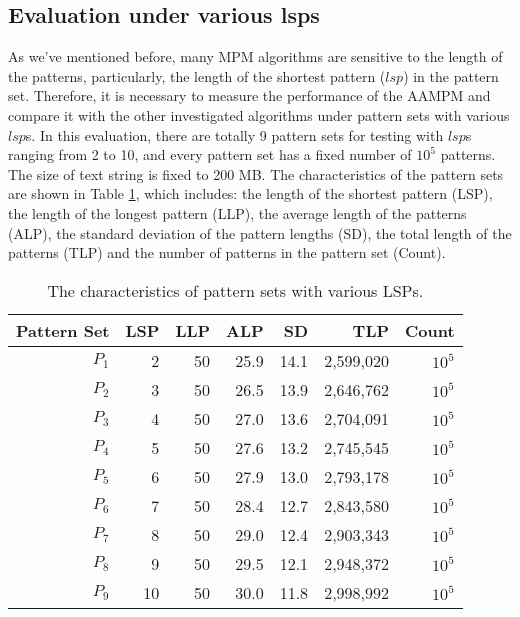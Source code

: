 \documentclass{article}
\begin{document}



\subsection{Evaluation under various lsps}

As we've mentioned before, many MPM algorithms are sensitive to the
length of the patterns, particularly, the length of the shortest
pattern ($lsp$) in the pattern set. Therefore, it is necessary to
measure the performance of the \textsf{AAMPM} and compare it with the
other investigated algorithms under pattern sets with various
$lsp$s. In this evaluation, there are totally 9 pattern sets for
testing with $lsp$s ranging from 2 to 10, and every pattern set has a
fixed number of $10^5$ patterns. The size of text string is fixed to
200 MB. The characteristics of the pattern sets are shown in Table
\ref{tab:lsps}, which includes: the length of the shortest pattern
(LSP), the length of the longest pattern (LLP), the average length of
the patterns (ALP), the standard deviation of the pattern lengths
(SD), the total length of the patterns (TLP) and the number of
patterns in the pattern set (Count).

\begin{table}
  \centering
  \caption{The characteristics of pattern sets with various LSPs.}
  \scriptsize
  \label{tab:lsps}
  \begin{tabular}{rrrrrrr}
    \hline
    Pattern Set & LSP  & LLP  & ALP & SD & TLP & Count\\
    \hline
    $P_1$ & 2 & 50 & 25.9 & 14.1 & 2,599,020 & $10^5$\\
    $P_2$ & 3 & 50 & 26.5 & 13.9 & 2,646,762 & $10^5$\\
    $P_3$ & 4 & 50 & 27.0 & 13.6 & 2,704,091 & $10^5$\\
    $P_4$ & 5 & 50 & 27.6 & 13.2 & 2,745,545 & $10^5$\\
    $P_5$ & 6 & 50 & 27.9 & 13.0 & 2,793,178 & $10^5$\\
    $P_6$ & 7 & 50 & 28.4 & 12.7 & 2,843,580 & $10^5$\\
    $P_7$ & 8 & 50 & 29.0 & 12.4 & 2,903,343 & $10^5$\\
    $P_8$ & 9 & 50 & 29.5 & 12.1 & 2,948,372 & $10^5$\\
    $P_9$ &10 & 50 & 30.0 & 11.8 & 2,998,992 & $10^5$\\
    \hline
  \end{tabular}
\end{table}
\end{document}
